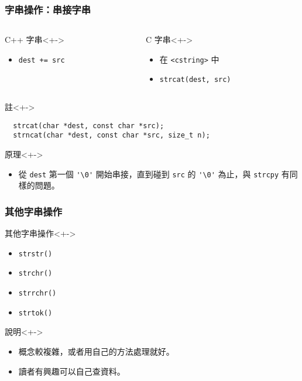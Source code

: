 \documentclass[utf8]{beamer}
\begin{document}
\begin{CJK}{UTF8}{bkai}
\begin{frame}[fragile]
  \frametitle{字串操作：串接字串}
  \begin{columns}[T]
    \begin{column}[T]{5.5cm}
    \begin{block}{C++ 字串}<+->
      \begin{itemize}
      \item \lstinline{dest += src}{}
      \end{itemize}
    \end{block}
    \end{column}
    \begin{column}[T]{5.5cm}
    \begin{block}{C 字串}<+->
      \begin{itemize}[<+->]
      \item 在 \lstinline{<cstring>}{} 中
      \item \lstinline{strcat(dest, src)}{}
      \end{itemize}
    \end{block}
    \end{column}
  \end{columns}
  \begin{alertblock}{註}<+->
    \begin{lstlisting}
  strcat(char *dest, const char *src);
  strncat(char *dest, const char *src, size_t n);
    \end{lstlisting}
  \end{alertblock}
  \begin{exampleblock}{原理}<+->
    \begin{itemize}
    \item 從 \lstinline{dest}{} \alert{第一個} \lstinline{'\0'}{} 開始串接，直到碰到 \lstinline{src}{} 的 \lstinline{'\0'}{} 為止，與 \lstinline{strcpy}{} 有同樣的問題。
    \end{itemize}
  \end{exampleblock}
\end{frame}

\begin{frame}[fragile]
  \frametitle{其他字串操作}
  \begin{block}{其他字串操作}<+->
    \begin{itemize}[<+->]
    \item \lstinline{strstr()}{}
    \item \lstinline{strchr()}{}
    \item \lstinline{strrchr()}{}
    \item \lstinline{strtok()}{}
    \end{itemize}
  \end{block}
  \begin{exampleblock}{說明}<+->
    \begin{itemize}
    \item 概念較複雜，或者用自己的方法處理就好。
    \item<+-> 讀者有興趣可以自己查資料。
    \end{itemize}
  \end{exampleblock}
\end{frame}


\end{CJK}
\end{document}
